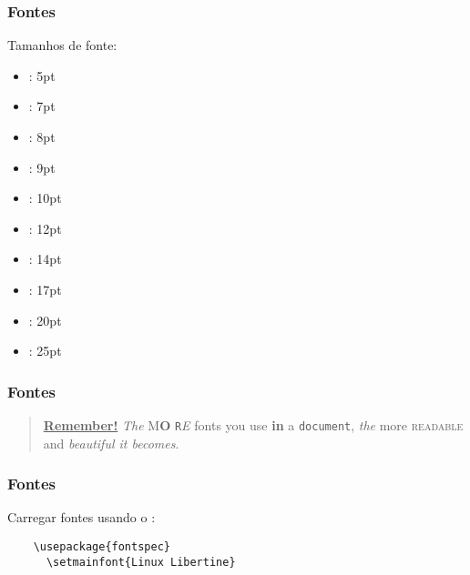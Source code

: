 \begin{frame}[fragile]
  \frametitle{Fontes}
  \large
  Tamanhos de fonte:
  \begin{multicols}{2}
    \begin{itemize}
      \item{: 5pt}
      \item{: 7pt}
      \item{: 8pt}
      \item{: 9pt}
      \item{: 10pt}
      \item{: 12pt}
      \item{: 14pt}
      \item{: 17pt}
      \item{: 20pt}
      \item{: 25pt}
    \end{itemize}
  \end{multicols}
\end{frame}

\begin{frame}
  \frametitle{Fontes}
  \begin{quote}
    \underline{\textbf{Remember\Huge!}} \textit{The}
    \textsf{M\textbf{\LARGE O} \texttt{R}\textsl{E}} fonts \Huge you
    \tiny use \footnotesize \textbf{in} a \small \texttt{document},
    \large \textit{the} \normalsize more \textsc{readable} and
    \textsl{\textsf{beautiful} it bec\large o\Large m\LARGE e\huge s}.
  \end{quote}
\end{frame}

\begin{frame}[fragile]
  \frametitle{Fontes}
  \Large
  Carregar fontes usando o :

  \begin{verbatim}
    \usepackage{fontspec}
      \setmainfont{Linux Libertine}
  \end{verbatim}
\end{frame}

